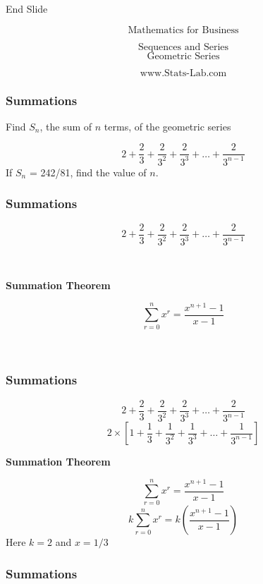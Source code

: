 End Slide



\huge
\[ \mbox{ Mathematics for Business  }  \]

\[ \mbox{ Sequences and Series  }  \]
\[ \mbox{ Geometric Series   }  \]

\[ \mbox{ www.Stats-Lab.com
  }  \]



\frametitle{Summations}

Find $S_n$, the sum of $n$ terms, of the geometric series

\[  2 + \frac{2}{3} + \frac{2}{3^2} + \frac{2}{3^3} +  \ldots + \frac{2}{3^{n-1}} \]
\bigskip
If $S_n$ = 242/81, find the value of $n$.




\frametitle{Summations}

\[  2 + \frac{2}{3} + \frac{2}{3^2} + \frac{2}{3^3} +  \ldots + \frac{2}{3^{n-1}} \]
\[ \phantom{ 2 \times \left[ 1 + \frac{1}{3} + \frac{1}{3^2} + \frac{1}{3^3} +  \ldots + \frac{1}{3^{n-1}}   \right]  } \]


\textbf{Summation Theorem}

\[ \sum^{n}_{r=0} x^r = \frac{x^{n+1}-1}{x-1} \]
\[ \phantom{k \sum^{n}_{r=0} x^r = k \frac{x^{n+1}-1}{x-1}  } \]
\phantom{Here $k=2$ and $x = 1/3$ }





\frametitle{Summations}

\[  2 + \frac{2}{3} + \frac{2}{3^2} + \frac{2}{3^3} +  \ldots + \frac{2}{3^{n-1}} \]
\[  2 \times \left[ 1 + \frac{1}{3} + \frac{1}{3^2} + \frac{1}{3^3} +  \ldots + \frac{1}{3^{n-1}}   \right] \]

\textbf{Summation Theorem}

\[ \sum^{n}_{r=0} x^r = \frac{x^{n+1}-1}{x-1} \]
\[ k  \sum^{n}_{r=0} x^r  =  k \left( \frac{x^{n+1}-1}{x-1} \right) \]
Here $k=2$ and $x = 1/3$ 




\frametitle{Summations}


